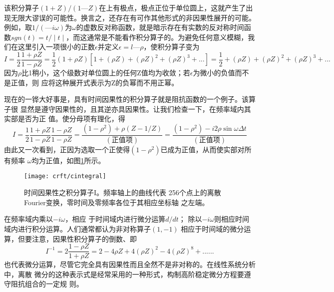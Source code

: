 该积分算子$(1 + Z)/(1 — Z)$在上有极点，极点正位于单位圆上，这就产生了出现无限大谬误的可能性。换言之，还存在有可作其他形式的非因果性展开的可能。例如，取$1/( —i\omega )$为$\omega$的虚数反对称函数，就是暗示存在有实数的反对称时间函数$sgn(t)=t/\mid t\mid$，而这通常是不能看作积分算子的。为避免任何意义模糊，我们在这里引入一项很小的正数$\epsilon$并定义$\epsilon =l—\rho$，使积分算子变为
\begin{subequations}
\begin{equation}
I=\frac{1}{2}\frac{1+\rho Z}{1-\rho Z}=\frac{1}{2}(1+\rho Z)
[1+(\rho Z)+(\rho Z)^2+(\rho Z)^3+...]
\label{eq:ex4.6.15a}
\end{equation}
\begin{equation}
=\frac{1}{2}+(\rho Z)+(\rho Z)^2+(\rho Z)^3+...
\label{eq:ex4.6.15b}
\end{equation}
\label{eq:ex4.6.15}
\end{subequations}
因为$\rho$比1稍小，这个级数对单位圆上的任何Z值均为收敛；若$\epsilon$为微小的负值而不是正值，则
应将这种展开式表示为Z的负幂而不用正幂。

现在的一铧大好事是，具有时间因果性的积分算子就是阻抗函数的一个例子。该算子很
显然是遵守因果性的，且其逆亦具因果性。让我们检查一下，在频率域内其实部是否为正
值。使分母项有理化，得
\begin{subequations}
\begin{equation}
I=\frac{1}{2}\frac{1+\rho Z}{1-\rho Z}\frac{1-\rho Z}{1-\rho Z}=
\frac{(1-\rho^2)+\rho(Z-1/Z)}{(\text{正值项})}
\label{eq:ex4.6.16a}
\end{equation}
\begin{equation}
=\frac{(1-\rho^2)-i2\rho\sin\omega\Delta t}{(\text{正值项})}
\label{eq:ex4.6.16b}
\end{equation}
\label{eq:ex4.6.16}
\end{subequations}
由此又一次看到，正因为选取一个正使得$(1-\rho^2)$已成为正值，从而使实部对所有频率
$\omega$均为正值，如图\ref{fig:crft/cintegral}所示。

\begin{figure}[H]
\centering
\texttt{[image: crft/cintegral]}
\caption[cintegral]{时间因果性之积分算子I。频率轴上的曲线代表
256个点上的离散Fourier变换，零时间及零频率各位于其相应坐标轴
之左端。}
\label{fig:crft/cintegral}
\end{figure}

在频率域内乘以$-i\omega$，相应
于时间域内进行微分运箅$d/dt$；
除以$-i\omega$则相应时间域内进行积分运算。人们通常都认为非对称算子$(1,-1)$
相应于时间域的微分运算，但要注意，因果性积分算子的倒数、即
\begin{equation}
I^{-1}=2\frac{1-\rho Z}{1+\rho Z}=2-4\rho Z+4(\rho Z)^2-4(\rho Z)^8+
......
\label{eq:ex4.6.17}
\end{equation}
也代表微分运算，尽管它完全具有因果性而且全然不是非对称的。在线性系统分析中，离散
微分的这种表示式是经常采用的一种形式，构制高阶稳定微分方程要遵守阻抗组合的一定规
则。

